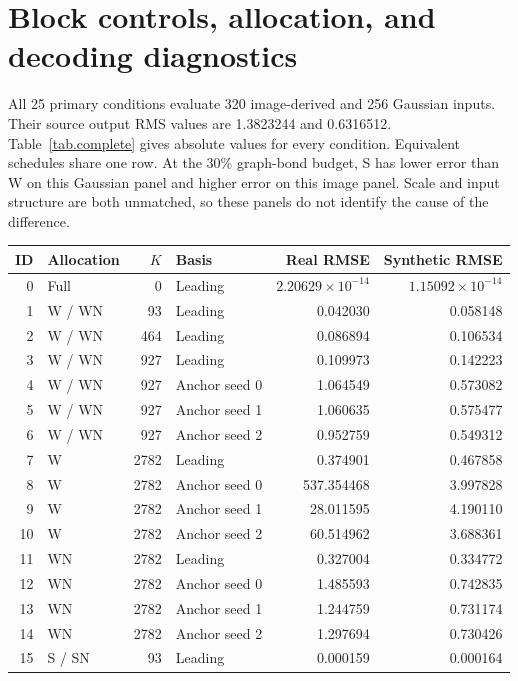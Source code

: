 \documentclass{article}
\begin{document}
\clearpage
\section{Block controls, allocation, and decoding diagnostics}
\label{app.block}

All 25 primary conditions evaluate 320 image-derived and 256 Gaussian inputs. Their source output RMS values are 1.3823244 and 0.6316512. Table~\ref{tab.complete} gives absolute values for every condition. Equivalent schedules share one row. At the 30\% graph-bond budget, S has lower error than W on this Gaussian panel and higher error on this image panel. Scale and input structure are both unmatched, so these panels do not identify the cause of the difference.

\begin{table}[ht]
\centering
\small
\setlength{\tabcolsep}{5pt}
\begin{tabular}{@{}rlrlrr@{}}
\toprule
ID & Allocation & $K$ & Basis & Real RMSE & Synthetic RMSE\\
\midrule
0 & Full & 0 & Leading & $2.20629\times10^{-14}$ & $1.15092\times10^{-14}$\\
1 & W / WN & 93 & Leading & 0.042030 & 0.058148\\
2 & W / WN & 464 & Leading & 0.086894 & 0.106534\\
3 & W / WN & 927 & Leading & 0.109973 & 0.142223\\
4 & W / WN & 927 & Anchor seed 0 & 1.064549 & 0.573082\\
5 & W / WN & 927 & Anchor seed 1 & 1.060635 & 0.575477\\
6 & W / WN & 927 & Anchor seed 2 & 0.952759 & 0.549312\\
7 & W & 2782 & Leading & 0.374901 & 0.467858\\
8 & W & 2782 & Anchor seed 0 & 537.354468 & 3.997828\\
9 & W & 2782 & Anchor seed 1 & 28.011595 & 4.190110\\
10 & W & 2782 & Anchor seed 2 & 60.514962 & 3.688361\\
11 & WN & 2782 & Leading & 0.327004 & 0.334772\\
12 & WN & 2782 & Anchor seed 0 & 1.485593 & 0.742835\\
13 & WN & 2782 & Anchor seed 1 & 1.244759 & 0.731174\\
14 & WN & 2782 & Anchor seed 2 & 1.297694 & 0.730426\\
15 & S / SN & 93 & Leading & 0.000159 & 0.000164\\

\end{tabular}
\end{table}
\end{document}
